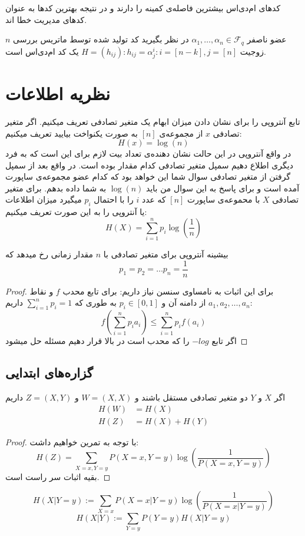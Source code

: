 کدهای ام‌دی‌اس بیشترین فاصله‌ی کمینه را دارند و در نتیجه بهترین کدها به عنوان کدهای مدیریت خطا اند.
\begin{example}
	$n$
	عضو ناصفر
	$\alpha_1, \ldots, \alpha_n \in \mathcal{F}_q$
	در نظر بگیرید کد تولید شده توسط ماتریس بررسی زوجیت 
	$H = (h_{ij}): h_{ij} = \alpha_j^i: i = [n - k], j = [n]$
	یک کد ام‌دی‌اس است.
\end{example}
\section{
    ‌نظریه اطلاعات
}

تابع آنتروپی را برای نشان دادن میزان ابهام یک متغیر تصادفی تعریف میکنیم. اگر متغیر تصادفی
$x$
از مجموعه‌ی
$[n]$
به صورت یکنواخت بیایید تعریف میکنیم:
$$H(x) = \log(n)$$
در واقع آنتروپی در این حالت نشان دهنده‌ی تعداد بیت لازم برای این است که به فرد دیگری اطلاع دهیم سمپل متغیر تصادفی کدام مقدار بوده است. در واقع بعد از سمپل گرفتن از متغیر تصادفی سوال شما این خواهد بود که کدام عضو مجموعه‌ی ساپورت آمده است و برای پاسخ به این سوال من باید
$\log(n)$
به شما داده بدهم.
برای متغیر تصادفی
$X$
با محموعه‌ی ساپورت
$[n]$
که عدد
$i$
را با احتمال
$p_i$
میگیرد میزان اطلاعات یا آنتروپی را به این صورت تعریف میکنیم:
$$H(X) = \sum_{i = 1}^{n} p_i \log(\frac{1}{n})$$

\begin{theorem}
بیشینه آنتروپی برای متغیر تصادفی با
$n$
مقدار زمانی رخ میدهد که
$$p_1 = p_2 = \dots p_n = \frac{1}{n}$$
\end{theorem}
\begin{proof}
برای این اثبات به نامساوی سنسن نیاز داریم: برای تابع محدب
$f$
و نقاط
$a_1, a_2, \dots, a_n$
از دامنه آن و
$p_i \in [0, 1]$
به طوری که
$\sum_{i = 1}^{n} p_i = 1$
داریم:
$$f(\sum_{i = 1}^{n} p_i a_i) \leq \sum_{i = 1}^{n} p_i f(a_i)$$
اگر تابع
$- log$
را که محدب است در بالا قرار دهیم مسئله حل میشود
\end{proof}

\subsection{گزاره‌های ابتدایی}
\begin{theorem}
اگر
$X$
و
$Y$
دو متغیر تصادفی مستقل باشند و
$W = (X, X)$
و
$Z = (X, Y)$
داریم
\begin{align*}
    H(W) &= H(X) \\
    H(Z) &= H(X) + H(Y)
\end{align*}
\end{theorem}
\begin{proof}
	با توجه به تمرین خواهیم داشت:
$$H(Z) = \sum_{X = x, Y = y} P(X = x, Y = y) \log(\frac{1}{ P(X = x, Y = y)})$$
بقیه اثبات سر راست است.
\end{proof}
\begin{definition}
$$H(X | Y = y) := \sum_{X = x} P(X = x| Y = y) \log(\frac{1}{P(X = x| Y = y)})$$
$$H(X|Y) := \sum_{Y = y} P(Y = y) H(X | Y = y)$$
\end{definition}

